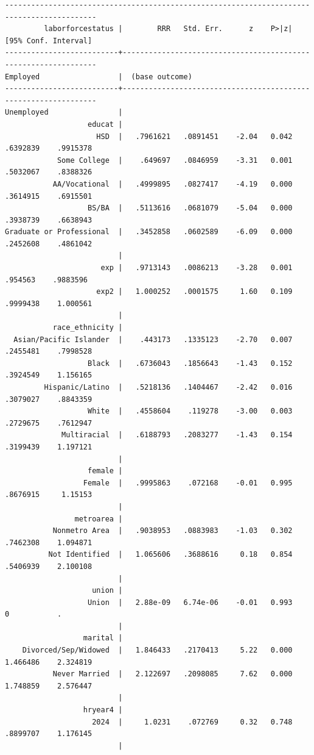 \documentclass[
]{book}
\begin{document}
\begin{verbatim}
-------------------------------------------------------------------------------------------
         laborforcestatus |        RRR   Std. Err.      z    P>|z|     [95% Conf. Interval]
--------------------------+----------------------------------------------------------------
Employed                  |  (base outcome)
--------------------------+----------------------------------------------------------------
Unemployed                |
                   educat |
                     HSD  |   .7961621   .0891451    -2.04   0.042     .6392839    .9915378
            Some College  |    .649697   .0846959    -3.31   0.001     .5032067    .8388326
           AA/Vocational  |   .4999895   .0827417    -4.19   0.000     .3614915    .6915501
                   BS/BA  |   .5113616   .0681079    -5.04   0.000     .3938739    .6638943
Graduate or Professional  |   .3452858   .0602589    -6.09   0.000     .2452608    .4861042
                          |
                      exp |   .9713143   .0086213    -3.28   0.001      .954563    .9883596
                     exp2 |   1.000252   .0001575     1.60   0.109     .9999438    1.000561
                          |
           race_ethnicity |
  Asian/Pacific Islander  |    .443173   .1335123    -2.70   0.007     .2455481    .7998528
                   Black  |   .6736043   .1856643    -1.43   0.152     .3924549    1.156165
         Hispanic/Latino  |   .5218136   .1404467    -2.42   0.016     .3079027    .8843359
                   White  |   .4558604    .119278    -3.00   0.003     .2729675    .7612947
             Multiracial  |   .6188793   .2083277    -1.43   0.154     .3199439    1.197121
                          |
                   female |
                  Female  |   .9995863    .072168    -0.01   0.995     .8676915     1.15153
                          |
                metroarea |
           Nonmetro Area  |   .9038953   .0883983    -1.03   0.302     .7462308    1.094871
          Not Identified  |   1.065606   .3688616     0.18   0.854     .5406939    2.100108
                          |
                    union |
                   Union  |   2.88e-09   6.74e-06    -0.01   0.993            0           .
                          |
                  marital |
    Divorced/Sep/Widowed  |   1.846433   .2170413     5.22   0.000     1.466486    2.324819
           Never Married  |   2.122697   .2098085     7.62   0.000     1.748859    2.576447
                          |
                  hryear4 |
                    2024  |     1.0231    .072769     0.32   0.748     .8899707    1.176145
                          |

\end{verbatim}
\end{document}
